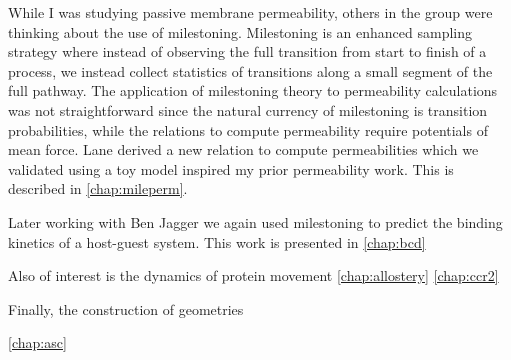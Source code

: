 \par While I was studying passive membrane permeability, others in the group were thinking about the use of milestoning.
Milestoning is an enhanced sampling strategy where instead of observing the full transition from start to finish of a process, we instead collect statistics of transitions along a small segment of the full pathway.
The application of milestoning theory to permeability calculations was not straightforward since the natural currency of milestoning is transition probabilities, while the relations to compute permeability require potentials of mean force.
Lane derived a new relation to compute permeabilities which we validated using a toy model inspired my prior permeability work.
This is described in \cref{chap:mileperm}.


\par Later working with Ben Jagger we again used milestoning to predict the binding kinetics of a host-guest system.
This work is presented in \cref{chap:bcd}

\par Also of interest is the dynamics of protein movement
\cref{chap:allostery} \cref{chap:ccr2}


\par Finally, the construction of geometries

\cref{chap:asc}







